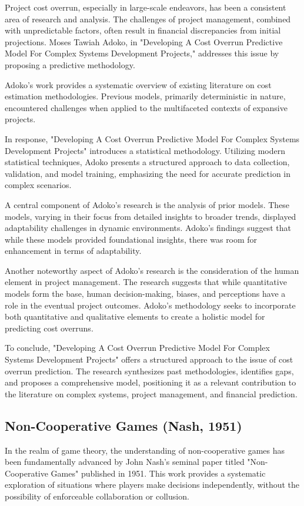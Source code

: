 \documentclass[sn-nature]{sn-jnl}%
\theoremstyle{thmstyleone}%
\theoremstyle{thmstyletwo}%
\theoremstyle{thmstylethree}%
\begin{document}
Project cost overrun, especially in large-scale endeavors, has been a consistent area of research and analysis. The challenges of project management, combined with unpredictable factors, often result in financial discrepancies from initial projections. Moses Tawiah Adoko, in "Developing A Cost Overrun Predictive Model For Complex Systems Development Projects," addresses this issue by proposing a predictive methodology.

Adoko's work provides a systematic overview of existing literature on cost estimation methodologies. Previous models, primarily deterministic in nature, encountered challenges when applied to the multifaceted contexts of expansive projects.

In response, "Developing A Cost Overrun Predictive Model For Complex Systems Development Projects" introduces a statistical methodology. Utilizing modern statistical techniques, Adoko presents a structured approach to data collection, validation, and model training, emphasizing the need for accurate prediction in complex scenarios.

A central component of Adoko's research is the analysis of prior models. These models, varying in their focus from detailed insights to broader trends, displayed adaptability challenges in dynamic environments. Adoko's findings suggest that while these models provided foundational insights, there was room for enhancement in terms of adaptability.

Another noteworthy aspect of Adoko's research is the consideration of the human element in project management. The research suggests that while quantitative models form the base, human decision-making, biases, and perceptions have a role in the eventual project outcomes. Adoko's methodology seeks to incorporate both quantitative and qualitative elements to create a holistic model for predicting cost overruns.

To conclude, "Developing A Cost Overrun Predictive Model For Complex Systems Development Projects" offers a structured approach to the issue of cost overrun prediction. The research synthesizes past methodologies, identifies gaps, and proposes a comprehensive model, positioning it as a relevant contribution to the literature on complex systems, project management, and financial prediction.
\subsection{Non-Cooperative Games (Nash, 1951)\cite{nash_non-cooperative_1951}}
In the realm of game theory, the understanding of non-cooperative games has been fundamentally advanced by John Nash's seminal paper titled "Non-Cooperative Games" published in 1951. This work provides a systematic exploration of situations where players make decisions independently, without the possibility of enforceable collaboration or collusion.
\end{document}
